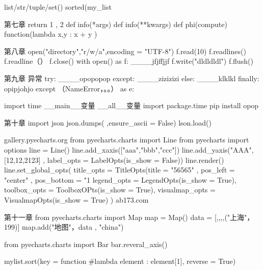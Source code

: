 list/str/tuple/set()  %
sorted(my_list%

第七章  
return 1 , 2
def info(*args) %
def info(**kwargs)  %
def phi(compute)   %
function(lambda x,y : x + y )  %

第八章
open("directory","r/w/a",encoding = "UTF-8")  %
f.read(10)  %
f.readlines()  %
f.readline（）  %
f.close()
with open() as f:  %
____jfjffjjf  
f.write("dldldldl")  %
f.flush()   %

第九章  异常
try:
____opopopop
except:
____zizizizi
else:
____klklkl
finally:
opipjohjo
except （NameError，。。） as e:  %

import time  %
__main__变量  %
__all__变量   %
import package.time
pip install opop 

第十章
import json
json.dumps(  ,ensure_ascii = False)  %
lson.load()  %

gallery.pyecharts.org   %
from pyecharts.charts import Line
from pyecharts import options
line = Line()
line.add_xaxis(["aaa","bbb","ccc"])
line.add_yaxis("AAA",[12,12,2123] , label_opts = LabelOpts(is_show = False))
line.render()
line.set_global_opts(
    title_opts = TitleOpts(title = "56565" , pos_left = "center" , pos_bottom = "1%
    legend_opts = LegendOpts(is_show = True),
    toolbox_opts = ToolboxOPts(is_show = True),
    visualmap_opts = VisualmapOpts(is_show = True)
)
ab173.com

第十一章
from pyecharts.charts import Map
map = Map()
data = [,,,,("上海"， 199)]
map.add("地图"，data , "china")

from pyecharts.charts import Bar
bar.reveral_axis()

mylist.sort(key = function #lambda element : element[1], reverse = True)










